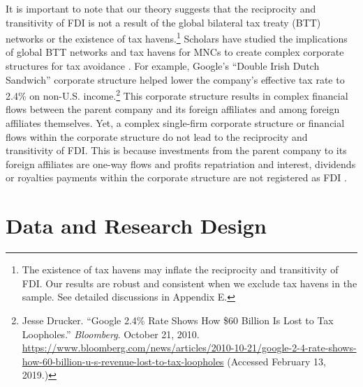 \documentclass[reqno,onecolumn,letterpaper,12pt]{article}
\begin{document}
It is important to note that our theory suggests that the reciprocity and transitivity of FDI is not a result of the global bilateral tax treaty (BTT) networks or the existence of tax havens.\footnote{The existence of tax havens may inflate the reciprocity and transitivity of FDI. Our results are robust and consistent when we exclude tax havens in the sample. See detailed discussions in Appendix E.} Scholars have studied the implications of global BTT networks and tax havens for MNCs to create complex corporate structures for tax avoidance \citep[e.g.,][]{Arel-Bundock:2017a}. For example, Google's ``Double Irish Dutch Sandwich'' corporate structure helped lower the company's effective tax rate to 2.4\% on non-U.S. income.\footnote{Jesse Drucker. ``Google 2.4\% Rate Shows How \$60 Billion Is Lost to Tax Loopholes.'' \emph{Bloomberg}. October 21, 2010. \url{https://www.bloomberg.com/news/articles/2010-10-21/google-2-4-rate-shows-how-60-billion-u-s-revenue-lost-to-tax-loopholes} (Accessed February 13, 2019.) } This corporate structure results in complex financial flows between the parent company and its foreign affiliates and among foreign affiliates themselves. Yet, a complex single-firm corporate structure or financial flows within the corporate structure do not lead to the reciprocity and transitivity of FDI. This is because investments from the parent company to its foreign affiliates are one-way flows and profits repatriation and interest, dividends or royalties payments within the corporate structure are not registered as FDI \citep[see,][]{Kerner:2014}.

\section{Data and Research Design}

\end{document}
